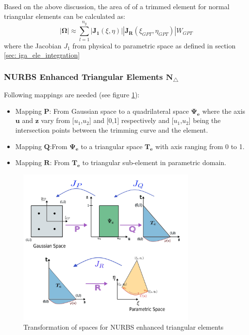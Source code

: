 \documentclass[12pt, a4paper]{report}
\begin{document}
Based on the above discussion, the area of of a trimmed element for normal triangular elements can be calculated as:
\begin{equation}
  \left| \boldsymbol{\Omega} \right| \approx \sum_{l=1}^{n_g} \left| \boldsymbol{J_1}(\xi, \eta) \right| \left| \boldsymbol{J_{R}}(\xi_{GPT}, \eta_{GPT}) \right| W_{GPT}
\end{equation}
where the Jacobian $J_1$ from physical to parametric space as defined in section \ref{sec: iga_ele_integration}



\subsubsection{NURBS Enhanced Triangular Elements $\boldsymbol{N_{\triangle}}$}
Following mappings are needed (see figure \ref{fig:Gauss_TRIANGLES_2}):
\begin{itemize}[label=$\ast$]
  \item Mapping $\boldsymbol{P}$: From Gaussian space to a quadrilateral space $\boldsymbol{\Psi_e}$ where the axis $\boldsymbol{u}$ and $\boldsymbol{z}$ vary from [$u_1$,$u_2$] and [0,1] respectively and [$u_1$,$u_2$] being the intersection points between the trimming curve and the element.
  \item Mapping $\boldsymbol{Q}$:From $\boldsymbol{\Psi_e}$ to a triangular space $\boldsymbol{T_e}$ with axis ranging from 0 to 1.
  \item Mapping $\boldsymbol{R}$: From $\boldsymbol{T_e}$ to triangular sub-element in parametric domain.
\end{itemize}
\begin{figure}[H]
\centering
\includegraphics[width=0.8\textwidth]{Images/gauss_triangle_trans_2.jpg}
\caption{Transformation of spaces for NURBS enhanced triangular elements}
\label{fig:Gauss_TRIANGLES_2}
\end{figure}
\end{document}
